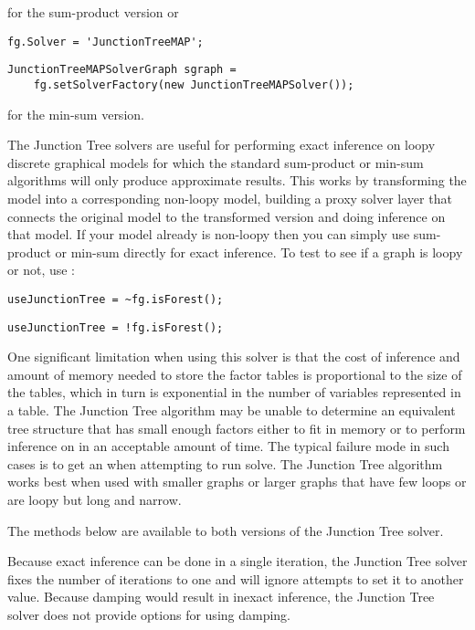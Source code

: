 for the sum-product version or

\ifmatlab
\begin{lstlisting}
fg.Solver = 'JunctionTreeMAP';
\end{lstlisting}
\fi

\ifjava
\begin{lstlisting}
JunctionTreeMAPSolverGraph sgraph =
    fg.setSolverFactory(new JunctionTreeMAPSolver());
\end{lstlisting}
\fi

for the min-sum version.

The Junction Tree solvers are useful for performing exact inference on loopy discrete graphical models for which the standard sum-product or min-sum algorithms will only produce approximate results. This works by transforming the model into a corresponding non-loopy model, building a proxy solver layer that connects the original model to the transformed version and doing inference on that model. If your model already is non-loopy then you can simply use sum-product or min-sum directly for exact inference. To test to see if a graph is loopy or not, use :

\ifmatlab
\begin{lstlisting}
useJunctionTree = ~fg.isForest();
\end{lstlisting}
\fi

\ifjava
\begin{lstlisting}
useJunctionTree = !fg.isForest();
\end{lstlisting}
\fi

One significant limitation when using this solver is that the cost of inference and amount of memory needed to store the factor tables is proportional to the size of the tables, which in turn is exponential in the number of variables represented in a table. The Junction Tree algorithm may be unable to determine an equivalent tree structure that has small enough factors either to fit in memory or to perform inference on in an acceptable amount of time. The typical failure mode in such cases is to get an  when attempting to run solve. The Junction Tree algorithm works best when used with smaller graphs or larger graphs that have few loops or are loopy but long and narrow.


The methods below are available to both versions of the Junction Tree solver.

Because exact inference can be done in a single iteration, the Junction Tree solver fixes the number of iterations to one and will ignore attempts to set it to another value. Because damping would result in inexact inference, the Junction Tree solver does not provide options for using damping.

